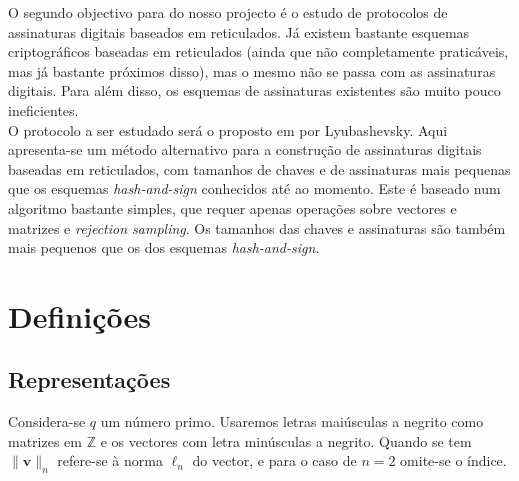 O segundo objectivo para do nosso projecto é o estudo de protocolos de assinaturas digitais baseados em reticulados. Já existem bastante esquemas criptográficos baseadas em reticulados (ainda que não completamente praticáveis, mas já bastante próximos disso), mas o mesmo não se passa com as assinaturas digitais. Para além disso, os esquemas de assinaturas existentes são muito pouco ineficientes.\\
O protocolo a ser estudado será o proposto em \cite{lattice_sig} por Lyubashevsky. Aqui apresenta-se um método alternativo para a construção de assinaturas digitais baseadas em reticulados, com tamanhos de chaves e de assinaturas mais pequenas que os esquemas \textit{hash-and-sign} conhecidos até ao momento. Este é baseado num algoritmo bastante simples, que requer apenas operações sobre vectores e matrizes e \textit{rejection sampling}. Os tamanhos das chaves e assinaturas são também mais pequenos que os dos esquemas \textit{hash-and-sign}.\\
\section{Definições}
\subsection{Representações}
Considera-se $q$ um número primo. Usaremos letras maiúsculas a negrito como matrizes em $\mathbb{Z}$ e os vectores com letra minúsculas a negrito. Quando se tem $\| \mathbf{v} \|_n$ refere-se à norma $\ell_n$ do vector, e para o caso de $n = 2$ omite-se o índice.\\
